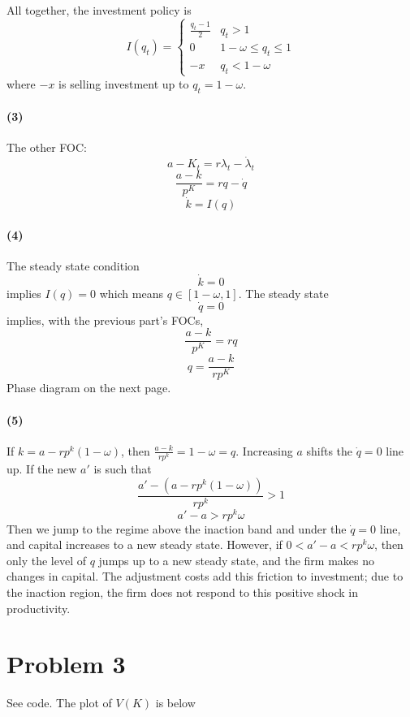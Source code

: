 \documentclass[10pt,letter]{article}
\newcommand{\problem}[1]{\section*{Problem #1}}
\newcommand{\problempart}[1]{\paragraph{#1}}
\begin{document}
All together, the investment policy is
\[ I(q_t) = \begin{cases}
\frac{q_t - 1}{2} & q_t > 1 \\
0 & 1-\omega \le q_t \le 1 \\
-x & q_t < 1-\omega
\end{cases} \]
where $-x$ is selling investment up to $q_t = 1-\omega$.
\problempart{(3)} The other FOC:
\[ a - K_t = r \lambda_t - \dot{\lambda}_t \]
\[ \frac{a - k}{p^K} = r q - \dot{q} \]
\[ \dot{k} = I(q) \]
\problempart{(4)} The steady state condition
\[  \dot{k} = 0 \]
implies $I(q) = 0$ which means $q \in [1-\omega, 1]$. The steady state
\[ \dot{q} = 0 \]
implies, with the previous part's FOCs,
\[ \frac{a - k}{p^K} = r q \]
\[ q = \frac{a - k}{rp^K} \]
Phase diagram on the next page.


\problempart{(5)}
If $k = a - rp^k(1-\omega)$, then $\frac{a-k}{rp^k} = 1-\omega = q$. Increasing $a$ shifts the $\dot{q} = 0$ line up. If the new $a'$ is such that
\[ \frac{a' - (a - rp^k(1-\omega))}{rp^k} > 1 \]
\[ a' - a > rp^k\omega \]
Then we jump to the regime above the inaction band and under the $\dot{q} = 0$ line, and capital increases to a new steady state. However, if $0 < a' - a < rp^k \omega$, then only the level of $q$ jumps up to a new steady state, and the firm makes no changes in capital. The adjustment costs add this friction to investment; due to the inaction region, the firm does not respond to this positive shock in productivity.
\problem{3}
See code. The plot of $V(K)$ is below
\end{document}
